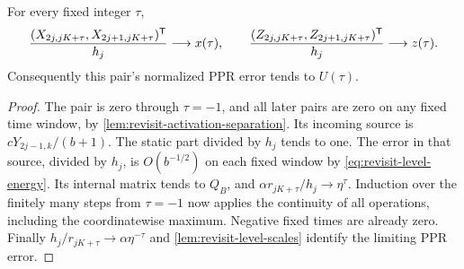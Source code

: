 \begin{lemma}
\label{lem:revisit-current-front}
For every fixed integer $\tau$,
\[
 \frac{(X_{2j,jK+\tau},X_{2j+1,jK+\tau})^{\mathsf{T}}}{h_j}
       \longrightarrow x(\tau),\qquad
 \frac{(Z_{2j,jK+\tau},Z_{2j+1,jK+\tau})^{\mathsf{T}}}{h_j}
       \longrightarrow z(\tau).
\]
Consequently this pair's normalized PPR error tends to $U(\tau)$.
\end{lemma}
\begin{proof}
The pair is zero through $\tau=-1$, and all later pairs are zero on any
fixed time window, by \cref{lem:revisit-activation-separation}.
Its incoming source is $cY_{2j-1,k}/(b+1)$. The static part divided by
$h_j$ tends to one. The error in that source, divided by $h_j$, is
$O(b^{-1/2})$ on each fixed window by
\cref{eq:revisit-level-energy}. Its internal matrix tends to $Q_B$, and
$\alpha r_{jK+\tau}/h_j\to\eta^\tau$.
Induction over the finitely many steps from $\tau=-1$ now applies the
continuity of all operations, including the coordinatewise maximum.
Negative fixed times are already zero. Finally
$h_j/r_{jK+\tau}\to\alpha\eta^{-\tau}$ and
\cref{lem:revisit-level-scales} identify the limiting PPR error.
\end{proof}

